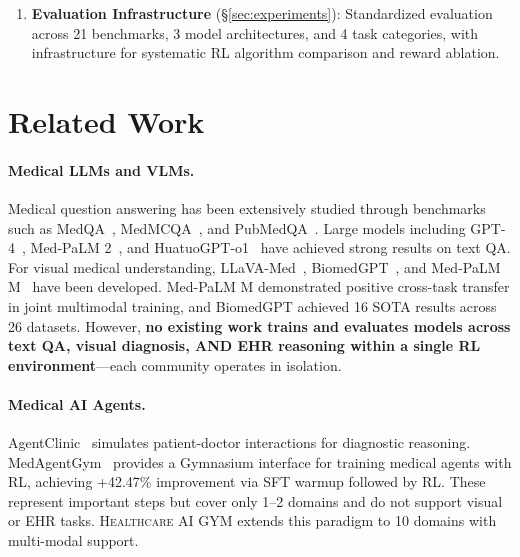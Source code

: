 \documentclass{article}
\newcommand{\gym}{\textsc{Healthcare AI GYM}}
\begin{document}
\begin{enumerate}[leftmargin=*]
    \item \textbf{Evaluation Infrastructure} (\S\ref{sec:experiments}): Standardized evaluation across 21 benchmarks, 3 model architectures, and 4 task categories, with infrastructure for systematic RL algorithm comparison and reward ablation.
\end{enumerate}


\section{Related Work}
\label{sec:related}

\paragraph{Medical LLMs and VLMs.}
Medical question answering has been extensively studied through benchmarks such as MedQA~\citep{jin2021medqa}, MedMCQA~\citep{pal2022medmcqa}, and PubMedQA~\citep{jin2019pubmedqa}. Large models including GPT-4~\citep{nori2023gpt4}, Med-PaLM 2~\citep{singhal2023medpalm2}, and HuatuoGPT-o1~\citep{chen2024huatuogpt} have achieved strong results on text QA. For visual medical understanding, LLaVA-Med~\citep{li2023llavamed}, BiomedGPT~\citep{zhang2024biomedgpt}, and Med-PaLM M~\citep{tu2024medpalmm} have been developed. Med-PaLM M demonstrated positive cross-task transfer in joint multimodal training, and BiomedGPT achieved 16 SOTA results across 26 datasets. However, \textbf{no existing work trains and evaluates models across text QA, visual diagnosis, AND EHR reasoning within a single RL environment}---each community operates in isolation.

\paragraph{Medical AI Agents.}
AgentClinic~\citep{schmidgall2025agentclinic} simulates patient-doctor interactions for diagnostic reasoning. MedAgentGym~\citep{medagentgym2026} provides a Gymnasium interface for training medical agents with RL, achieving +42.47\% improvement via SFT warmup followed by RL. These represent important steps but cover only 1--2 domains and do not support visual or EHR tasks. \gym{} extends this paradigm to 10 domains with multi-modal support.
\end{document}
